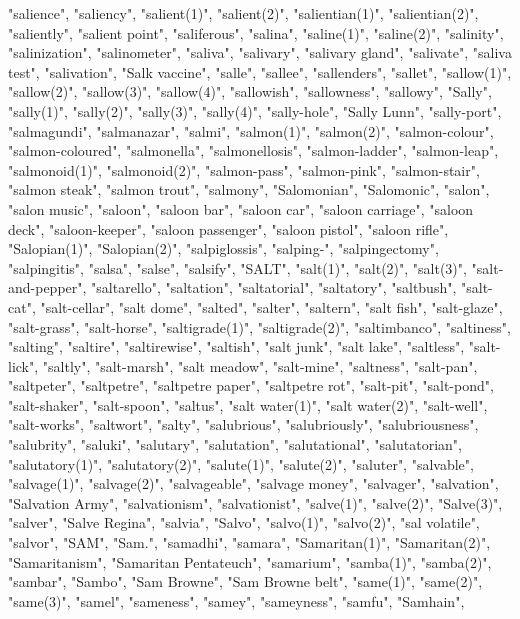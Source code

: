 "salience",
"saliency",
"salient(1)",
"salient(2)",
"salientian(1)",
"salientian(2)",
"saliently",
"salient point",
"saliferous",
"salina",
"saline(1)",
"saline(2)",
"salinity",
"salinization",
"salinometer",
"saliva",
"salivary",
"salivary gland",
"salivate",
"saliva test",
"salivation",
"Salk vaccine",
"salle",
"sallee",
"sallenders",
"sallet",
"sallow(1)",
"sallow(2)",
"sallow(3)",
"sallow(4)",
"sallowish",
"sallowness",
"sallowy",
"Sally",
"sally(1)",
"sally(2)",
"sally(3)",
"sally(4)",
"sally-hole",
"Sally Lunn",
"sally-port",
"salmagundi",
"salmanazar",
"salmi",
"salmon(1)",
"salmon(2)",
"salmon-colour",
"salmon-coloured",
"salmonella",
"salmonellosis",
"salmon-ladder",
"salmon-leap",
"salmonoid(1)",
"salmonoid(2)",
"salmon-pass",
"salmon-pink",
"salmon-stair",
"salmon steak",
"salmon trout",
"salmony",
"Salomonian",
"Salomonic",
"salon",
"salon music",
"saloon",
"saloon bar",
"saloon car",
"saloon carriage",
"saloon deck",
"saloon-keeper",
"saloon passenger",
"saloon pistol",
"saloon rifle",
"Salopian(1)",
"Salopian(2)",
"salpiglossis",
"salping-",
"salpingectomy",
"salpingitis",
"salsa",
"salse",
"salsify",
"SALT",
"salt(1)",
"salt(2)",
"salt(3)",
"salt-and-pepper",
"saltarello",
"saltation",
"saltatorial",
"saltatory",
"saltbush",
"salt-cat",
"salt-cellar",
"salt dome",
"salted",
"salter",
"saltern",
"salt fish",
"salt-glaze",
"salt-grass",
"salt-horse",
"saltigrade(1)",
"saltigrade(2)",
"saltimbanco",
"saltiness",
"salting",
"saltire",
"saltirewise",
"saltish",
"salt junk",
"salt lake",
"saltless",
"salt-lick",
"saltly",
"salt-marsh",
"salt meadow",
"salt-mine",
"saltness",
"salt-pan",
"saltpeter",
"saltpetre",
"saltpetre paper",
"saltpetre rot",
"salt-pit",
"salt-pond",
"salt-shaker",
"salt-spoon",
"saltus",
"salt water(1)",
"salt water(2)",
"salt-well",
"salt-works",
"saltwort",
"salty",
"salubrious",
"salubriously",
"salubriousness",
"salubrity",
"saluki",
"salutary",
"salutation",
"salutational",
"salutatorian",
"salutatory(1)",
"salutatory(2)",
"salute(1)",
"salute(2)",
"saluter",
"salvable",
"salvage(1)",
"salvage(2)",
"salvageable",
"salvage money",
"salvager",
"salvation",
"Salvation Army",
"salvationism",
"salvationist",
"salve(1)",
"salve(2)",
"Salve(3)",
"salver",
"Salve Regina",
"salvia",
"Salvo",
"salvo(1)",
"salvo(2)",
"sal volatile",
"salvor",
"SAM",
"Sam.",
"samadhi",
"samara",
"Samaritan(1)",
"Samaritan(2)",
"Samaritanism",
"Samaritan Pentateuch",
"samarium",
"samba(1)",
"samba(2)",
"sambar",
"Sambo",
"Sam Browne",
"Sam Browne belt",
"same(1)",
"same(2)",
"same(3)",
"samel",
"sameness",
"samey",
"sameyness",
"samfu",
"Samhain",
